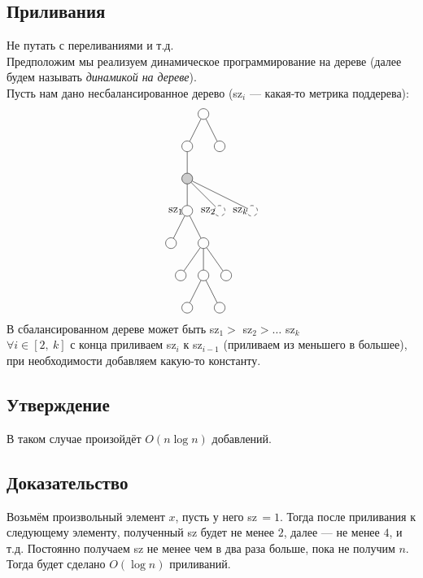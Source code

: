 \documentclass[12pt, a4paper]{article}
\begin{document}
    \subsection{Приливания}
    Не путать с переливаниями и т.д.\\
    Предположим мы реализуем динамическое программирование на дереве (далее будем называть \textit{динамикой на дереве}).\\
    Пусть нам дано несбалансированное дерево (sz$_i$ --- какая-то метрика поддерева):
    \[\begin{tikzpicture}
        \draw (-0.5, 0) node(0)[circle, draw]{};
        \draw (-1, -1) node(1)[circle, draw]{};
        \draw (0, -1) node(2)[circle, draw]{};
        \draw (-1, -2) node(3)[circle, draw, fill=gray!40]{};
        \draw (-1, -3) node(4)[circle, draw]{} node[anchor=east]{sz$_{1}$};
        \draw (-1.5, -4) node(5)[circle, draw]{};
        \draw (-0.5, -4) node(6)[circle, draw]{};
        \draw (0) -- (1);
        \draw (0) -- (2);
        \draw (1) -- (3);

        \draw (0, -3) node(12)[circle, dashed, draw]{} node[anchor=east]{sz$_2$};
        \draw (3) -- (12);
        \draw (1, -3) node(13)[circle, dashed, draw]{} node[anchor=east]{sz$_k$};
        \draw (3) -- (13);

        \draw (3) -- (4);
        \draw (4) -- (5);
        \draw (4) -- (6);
        \draw (-1.2, -5) node(7)[circle, draw]{};
        \draw (-0.5, -5) node(8)[circle, draw]{};
        \draw (0.2, -5) node(9)[circle, draw]{};
        \draw (6) -- (7);
        \draw (6) -- (8);
        \draw (6) -- (9);
        \draw (-1, -6) node(10)[circle, draw]{};
        \draw (0, -6) node(11)[circle, draw]{};
        \draw (8) -- (10);
        \draw (8) -- (11);
    \end{tikzpicture}\]
    В сбалансированном дереве может быть sz$_1 > $ sz$_2 > \dots$ sz$_k$\\
    $\forall i \in [2,\ k]$ с конца приливаем sz$_i$ к sz$_{i - 1}$ (приливаем из меньшего в большее), при необходимости добавляем какую-то константу.
    \subsection*{Утверждение}
    В таком случае произойдёт $O(n\log n)$ добавлений.
    \subsection*{Доказательство}
    Возьмём произвольный элемент $x$, пусть у него sz\,$= 1$. Тогда после приливания к следующему элементу, полученный sz будет не менее $2$, далее --- не менее $4$, и т.д. Постоянно получаем sz не менее чем в два раза больше, пока не получим $n$. Тогда будет сделано $O(\log n)$ приливаний.
\end{document}
